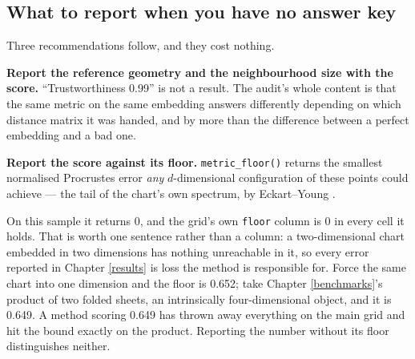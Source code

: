 \documentclass[
  british,
  a4paper,
]{book}
\newenvironment{Shaded}{\begin{snugshade}}{\end{snugshade}}
\newcommand{\AttributeTok}[1]{\textcolor[rgb]{0.13,0.29,0.53}{#1}}
\newcommand{\DataTypeTok}[1]{\textcolor[rgb]{0.13,0.29,0.53}{#1}}
\newcommand{\DecValTok}[1]{\textcolor[rgb]{0.00,0.00,0.81}{#1}}
\newcommand{\FloatTok}[1]{\textcolor[rgb]{0.00,0.00,0.81}{#1}}
\newcommand{\FunctionTok}[1]{\textcolor[rgb]{0.13,0.29,0.53}{\textbf{#1}}}
\newcommand{\NormalTok}[1]{#1}
\newcommand{\OtherTok}[1]{\textcolor[rgb]{0.56,0.35,0.01}{#1}}
\newcommand{\SpecialCharTok}[1]{\textcolor[rgb]{0.81,0.36,0.00}{\textbf{#1}}}
\begin{document}
\subsection{What to report when you have no answer key}\label{what-to-report-when-you-have-no-answer-key}

Three recommendations follow, and they cost nothing.

\textbf{Report the reference geometry and the neighbourhood size with the score.}
``Trustworthiness 0.99'' is not a result. The audit's whole content is that the
same metric on the same embedding answers differently depending on which
distance matrix it was handed, and by more than the difference between a perfect
embedding and a bad one.

\textbf{Report the score against its floor.} \texttt{metric\_floor()} returns the smallest
normalised Procrustes error \emph{any} \(d\)-dimensional configuration of these points
could achieve --- the tail of the chart's own spectrum, by Eckart--Young
\citep{eckart1936approximation}.

\begin{Shaded}
\end{Shaded}

On this sample it returns 0, and the grid's own \texttt{floor} column is
0 in every cell it holds. That is worth one sentence rather than a
column: a two-dimensional chart embedded in two dimensions has nothing
unreachable in it, so every error reported in Chapter \ref{results} is loss the
method is responsible for. Force the same chart into one dimension and the floor
is 0.652; take Chapter \ref{benchmarks}'s product of two
folded sheets, an intrinsically four-dimensional object, and it is
0.649. A method scoring 0.649 has thrown
away everything on the main grid and hit the bound exactly on the product.
Reporting the number without its floor distinguishes neither.
\end{document}
